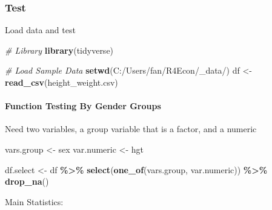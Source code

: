 \documentclass[
]{book}
\newenvironment{Shaded}{\begin{snugshade}}{\end{snugshade}}
\newcommand{\CommentTok}[1]{\textcolor[rgb]{0.56,0.35,0.01}{\textit{#1}}}
\newcommand{\DataTypeTok}[1]{\textcolor[rgb]{0.13,0.29,0.53}{#1}}
\newcommand{\KeywordTok}[1]{\textcolor[rgb]{0.13,0.29,0.53}{\textbf{#1}}}
\newcommand{\NormalTok}[1]{#1}
\newcommand{\OperatorTok}[1]{\textcolor[rgb]{0.81,0.36,0.00}{\textbf{#1}}}
\newcommand{\StringTok}[1]{\textcolor[rgb]{0.31,0.60,0.02}{#1}}
\begin{document}
\hypertarget{test}{%
\subsubsection{Test}\label{test}}

Load data and test

\begin{Shaded}
\begin{Highlighting}[]
\CommentTok{\# Library}
\KeywordTok{library}\NormalTok{(tidyverse)}

\CommentTok{\# Load Sample Data}
\KeywordTok{setwd}\NormalTok{(}\StringTok{\textquotesingle{}C:/Users/fan/R4Econ/\_data/\textquotesingle{}}\NormalTok{)}
\NormalTok{df \textless{}{-}}\StringTok{ }\KeywordTok{read\_csv}\NormalTok{(}\StringTok{\textquotesingle{}height\_weight.csv\textquotesingle{}}\NormalTok{)}
\end{Highlighting}
\end{Shaded}

\hypertarget{function-testing-by-gender-groups}{%
\paragraph{Function Testing By Gender Groups}\label{function-testing-by-gender-groups}}

Need two variables, a group variable that is a factor, and a numeric

\begin{Shaded}
\begin{Highlighting}[]
\NormalTok{vars.group \textless{}{-}}\StringTok{ \textquotesingle{}sex\textquotesingle{}}
\NormalTok{var.numeric \textless{}{-}}\StringTok{ \textquotesingle{}hgt\textquotesingle{}}
\end{Highlighting}
\end{Shaded}

\begin{Shaded}
\begin{Highlighting}[]
\NormalTok{df.select \textless{}{-}}\StringTok{ }\NormalTok{df }\OperatorTok{\%\textgreater{}\%}\StringTok{ }\KeywordTok{select}\NormalTok{(}\KeywordTok{one\_of}\NormalTok{(vars.group, var.numeric)) }\OperatorTok{\%\textgreater{}\%}\StringTok{ }\KeywordTok{drop\_na}\NormalTok{()}
\end{Highlighting}
\end{Shaded}

Main Statistics:

\begin{Shaded}
\end{Shaded}
\end{document}
